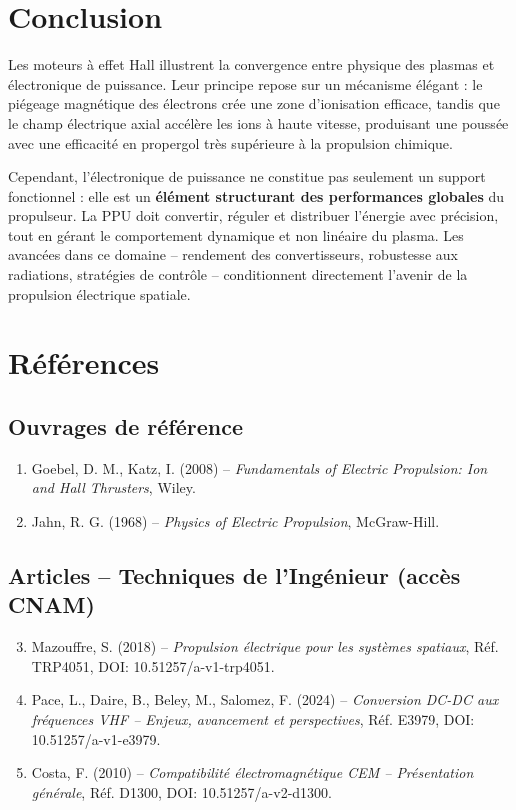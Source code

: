 \documentclass[12pt,a4paper]{article}
\begin{document}
\section{Conclusion}

Les moteurs à effet Hall illustrent la convergence entre physique des plasmas et électronique de puissance. Leur principe repose sur un mécanisme élégant : le piégeage magnétique des électrons crée une zone d'ionisation efficace, tandis que le champ électrique axial accélère les ions à haute vitesse, produisant une poussée avec une efficacité en propergol très supérieure à la propulsion chimique.

Cependant, l'électronique de puissance ne constitue pas seulement un support fonctionnel : elle est un \textbf{élément structurant des performances globales} du propulseur. La PPU doit convertir, réguler et distribuer l'énergie avec précision, tout en gérant le comportement dynamique et non linéaire du plasma. Les avancées dans ce domaine -- rendement des convertisseurs, robustesse aux radiations, stratégies de contrôle -- conditionnent directement l'avenir de la propulsion électrique spatiale.

\section{Références}

\subsection*{Ouvrages de référence}
\begin{enumerate}
    \item Goebel, D. M., Katz, I. (2008) -- \textit{Fundamentals of Electric Propulsion: Ion and Hall Thrusters}, Wiley.
    \item Jahn, R. G. (1968) -- \textit{Physics of Electric Propulsion}, McGraw-Hill.
\end{enumerate}

\subsection*{Articles -- Techniques de l'Ingénieur (accès CNAM)}
\begin{enumerate}
    \setcounter{enumi}{2}
    \item Mazouffre, S. (2018) -- \textit{Propulsion électrique pour les systèmes spatiaux}, Réf. TRP4051, DOI: 10.51257/a-v1-trp4051.
    \item Pace, L., Daire, B., Beley, M., Salomez, F. (2024) -- \textit{Conversion DC-DC aux fréquences VHF -- Enjeux, avancement et perspectives}, Réf. E3979, DOI: 10.51257/a-v1-e3979.
    \item Costa, F. (2010) -- \textit{Compatibilité électromagnétique CEM -- Présentation générale}, Réf. D1300, DOI: 10.51257/a-v2-d1300.
\end{enumerate}
\end{document}
